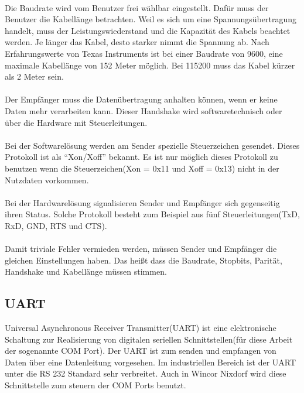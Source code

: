 \paragraph{}
Die Baudrate wird vom Benutzer frei wählbar eingestellt. Dafür muss der Benutzer die Kabellänge betrachten. Weil es sich um eine Spannungsübertragung handelt, muss der Leistungswiederstand und die Kapazität des Kabels beachtet werden. Je länger das Kabel, desto starker nimmt die Spannung ab. Nach Erfahrungswerte von Texas Instruments ist bei einer Baudrate von 9600, eine maximale Kabellänge von 152 Meter möglich. Bei 115200 muss das Kabel kürzer als 2 Meter sein.

\paragraph{}
Der Empfänger muss die Datenübertragung anhalten können, wenn er keine Daten mehr verarbeiten kann. Dieser Handshake wird softwaretechnisch oder über die Hardware mit Steuerleitungen.

\paragraph{}
Bei der Softwarelösung werden am Sender spezielle Steuerzeichen gesendet. Dieses Protokoll ist als "`Xon/Xoff"' bekannt. Es ist nur möglich dieses Protokoll zu benutzen wenn die Steuerzeichen(Xon = 0x11 und Xoff = 0x13) nicht in der Nutzdaten vorkommen.

\paragraph{}
Bei der Hardwarelösung signalisieren Sender und Empfänger sich gegenseitig ihren Status. Solche Protokoll besteht zum Beispiel aus fünf Steuerleitungen(TxD, RxD, GND, RTS und CTS).

\paragraph{}
Damit triviale Fehler vermieden werden, müssen Sender und Empfänger die gleichen Einstellungen haben. Das heißt dass die Baudrate, Stopbits, Parität, Handshake und Kabellänge müssen stimmen.


\subsection{UART}
Universal Asynchronous Receiver Transmitter(UART) ist eine elektronische Schaltung zur Realisierung von digitalen seriellen Schnittstellen(für diese Arbeit der sogenannte COM Port). Der UART ist zum senden und empfangen von Daten über eine Datenleitung vorgesehen. Im industriellen Bereich ist der UART unter die RS 232 Standard sehr verbreitet. Auch in Wincor Nixdorf wird diese Schnittstelle zum steuern der COM Ports benutzt.

